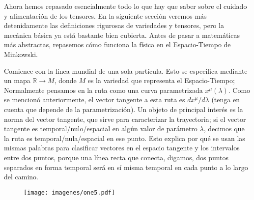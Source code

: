 \documentclass[11pt,b5paper,openany,twoside]{book}
\begin{document}
Ahora hemos repasado esencialmente todo lo que hay que saber sobre el cuidado y alimentación de los tensores.
En la siguiente sección veremos más detenidamente las definiciones rigurosas de variedades y tensores, pero la mecánica básica ya está bastante bien cubierta.
Antes de pasar a matemáticas más abstractas, repasemos cómo funciona la física en el Espacio-Tiempo de Minkowski.

Comience con la línea mundial de una sola partícula.
Esto se especifica mediante un mapa $\mathbb{R} \rightarrow M$, donde $M$ es la variedad que representa el Espacio-Tiempo; Normalmente pensamos en la ruta como una curva parametrizada $x^\mu(\lambda)$.
Como se mencionó anteriormente, el vector tangente a esta ruta es $dx^\mu/d\lambda$ (tenga en cuenta que depende de la parametrización).
Un objeto de principal interés es la norma del vector tangente, que sirve para caracterizar la trayectoria; si el vector tangente es temporal/nulo/espacial en algún valor de parámetro $\lambda$, decimos que la ruta es temporal/nula/espacial en ese punto.
Esto explica por qué se usan las mismas palabras para clasificar vectores en el espacio tangente y los intervalos entre dos puntos, porque una línea recta que conecta, digamos, dos puntos separados en forma temporal será en sí misma temporal en cada punto a lo largo del camino.

\begin{figure}[h]
\centering
\texttt{[image: imagenes/one5.pdf]}
\end{figure}
\end{document}
